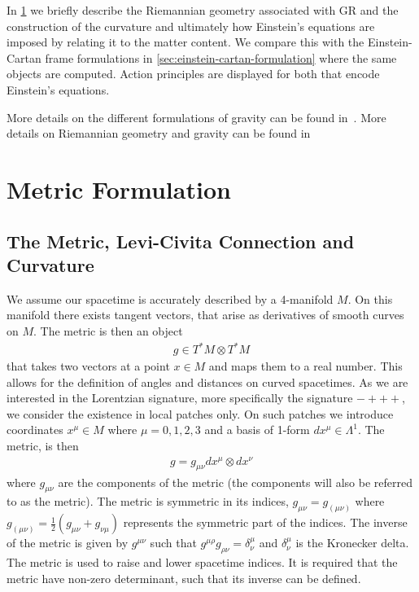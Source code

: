 \documentclass[10pt]{report}
\theoremstyle{definition}
\begin{document}
In \cref{sec:metric-formulations} we briefly describe the Riemannian geometry associated with GR and the construction of the curvature and ultimately how Einstein's equations are imposed by relating it to the matter content. We compare this with the Einstein-Cartan frame formulations in \cref{sec:einstein-cartan-formulation} where the same objects are computed. Action principles are displayed for both that encode Einstein's equations.

More details on the different formulations of gravity can be found in~\cite{Krasnov2020-qr,PlebanskiFormuKrasno2009}. More details on Riemannian geometry and gravity can be found in~\cite{Geometry_Topol_Nakaha_2018,Carroll_2019}

\section{Metric Formulation}\label{sec:metric-formulations}

\subsection{The Metric, Levi-Civita Connection and Curvature}
We assume our spacetime is accurately described by a 4-manifold $M$. On this manifold there exists tangent vectors, that arise as derivatives of smooth curves on $M$. The metric is then an object 
\begin{align}
    g \in T^*M \otimes T^*M
\end{align}
that takes two vectors at a point $x \in M$ and maps them to a real number. This allows for the definition of angles and distances on curved spacetimes. As we are interested in the Lorentzian signature, more specifically the signature $-+++$, we consider the existence in local patches only. On such patches we introduce coordinates $x^\mu \in M$ where $\mu = 0,1,2,3$ and a basis of 1-form $dx^\mu \in \Lambda^1$. The metric, is then
\begin{align}
    g = g_{\mu\nu} dx^\mu \otimes dx^\nu 
\end{align}
where $g_{\mu\nu}$ are the components of the metric (the components will also be referred to as the metric). The metric is symmetric in its indices, $g_{\mu\nu} = g_{(\mu\nu)}$ where $g_{(\mu\nu)} = \frac{1}{2} \left( g_{\mu\nu} + g_{\nu\mu} \right)$ represents the symmetric part of the indices. The inverse of the metric is given by $g^{\mu\nu}$ such that $g^{\mu\rho} g_{\rho\nu} = \delta^\mu_\nu$ and $\delta^\mu_\nu$ is the Kronecker delta. The metric is used to raise and lower spacetime indices. It is required that the metric have non-zero determinant, such that its inverse can be defined.
\end{document}

